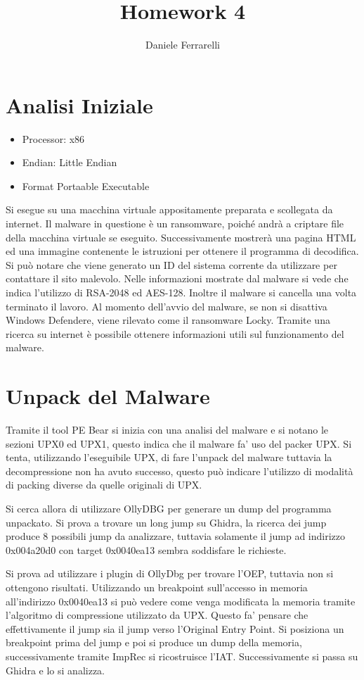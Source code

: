 \documentclass[]{article}
\title{Homework 4}
\author{Daniele Ferrarelli}
\date{}
\begin{document}
\maketitle
\section{Analisi Iniziale}
\begin{itemize}
	\item Processor: x86
	\item Endian: Little Endian
	\item Format Portaable Executable
\end{itemize}


Si esegue su una macchina virtuale appositamente preparata e scollegata  da internet. Il malware in questione è un ransomware, poiché andrà a criptare file della macchina virtuale se eseguito. Successivamente mostrerà una pagina HTML ed una immagine contenente le istruzioni per ottenere il programma di decodifica. Si può notare che viene generato un ID del sistema corrente da utilizzare per contattare il sito malevolo. Nelle informazioni mostrate dal malware si vede che indica l'utilizzo di RSA-2048 ed AES-128.  Inoltre il malware si cancella una volta terminato il lavoro. Al momento dell'avvio del malware, se non si disattiva Windows Defendere, viene rilevato come il ransomware Locky. Tramite una ricerca su internet è possibile ottenere informazioni utili sul funzionamento del malware. 

\section{Unpack del Malware}
Tramite il tool PE Bear si inizia con una analisi del malware e si notano le sezioni UPX0 ed UPX1, questo indica che il malware fa' uso del packer UPX. Si tenta, utilizzando l'eseguibile UPX, di fare l'unpack del malware tuttavia la decompressione non ha avuto successo, questo può indicare l'utilizzo di modalità di packing diverse da quelle originali di UPX.

Si cerca allora di utilizzare OllyDBG per generare un dump del programma unpackato. Si prova a trovare un long jump su Ghidra, la ricerca dei jump produce 8 possibili jump da analizzare, tuttavia solamente il jump ad indirizzo 0x004a20d0 con target 0x0040ea13 sembra soddisfare le richieste. 

Si prova ad utilizzare i plugin di OllyDbg per trovare l'OEP, tuttavia non si ottengono risultati.
Utilizzando un breakpoint sull'accesso in memoria all'indirizzo 0x0040ea13 si può vedere come venga modificata la memoria tramite l'algoritmo di compressione utilizzato da UPX. Questo fa' pensare che effettivamente il jump sia il jump verso l'Original Entry Point. Si posiziona un breakpoint prima del jump e poi si produce un dump della memoria, successivamente tramite ImpRec si ricostruisce l'IAT.
Successivamente si passa su Ghidra e lo si analizza.
\end{document}
